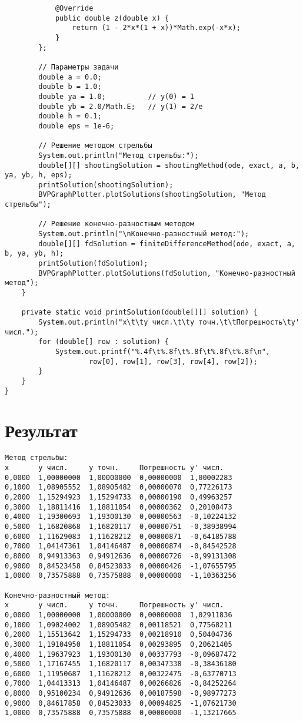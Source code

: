 \begin{verbatim}
            @Override
            public double z(double x) {
                return (1 - 2*x*(1 + x))*Math.exp(-x*x);
            }
        };

        // Параметры задачи
        double a = 0.0;
        double b = 1.0;
        double ya = 1.0;          // y(0) = 1
        double yb = 2.0/Math.E;   // y(1) = 2/e
        double h = 0.1;
        double eps = 1e-6;

        // Решение методом стрельбы
        System.out.println("Метод стрельбы:");
        double[][] shootingSolution = shootingMethod(ode, exact, a, b, ya, yb, h, eps);
        printSolution(shootingSolution);
        BVPGraphPlotter.plotSolutions(shootingSolution, "Метод стрельбы");

        // Решение конечно-разностным методом
        System.out.println("\nКонечно-разностный метод:");
        double[][] fdSolution = finiteDifferenceMethod(ode, exact, a, b, ya, yb, h);
        printSolution(fdSolution);
        BVPGraphPlotter.plotSolutions(fdSolution, "Конечно-разностный метод");
    }

    private static void printSolution(double[][] solution) {
        System.out.println("x\t\ty числ.\t\ty точн.\t\tПогрешность\ty' числ.");
        for (double[] row : solution) {
            System.out.printf("%.4f\t%.8f\t%.8f\t%.8f\t%.8f\n",
                    row[0], row[1], row[3], row[4], row[2]);
        }
    }
}
\end{verbatim}

\section*{Результат}

\begin{verbatim}
Метод стрельбы:
x		y числ.		y точн.		Погрешность	y' числ.
0,0000	1,00000000	1,00000000	0,00000000	1,00002283
0,1000	1,08905552	1,08905482	0,00000070	0,77226173
0,2000	1,15294923	1,15294733	0,00000190	0,49963257
0,3000	1,18811416	1,18811054	0,00000362	0,20108473
0,4000	1,19300693	1,19300130	0,00000563	-0,10224132
0,5000	1,16820868	1,16820117	0,00000751	-0,38938994
0,6000	1,11629083	1,11628212	0,00000871	-0,64185788
0,7000	1,04147361	1,04146487	0,00000874	-0,84542528
0,8000	0,94913363	0,94912636	0,00000726	-0,99131308
0,9000	0,84523458	0,84523033	0,00000426	-1,07655795
1,0000	0,73575888	0,73575888	0,00000000	-1,10363256

Конечно-разностный метод:
x		y числ.		y точн.		Погрешность	y' числ.
0,0000	1,00000000	1,00000000	0,00000000	1,02911836
0,1000	1,09024002	1,08905482	0,00118521	0,77568211
0,2000	1,15513642	1,15294733	0,00218910	0,50404736
0,3000	1,19104950	1,18811054	0,00293895	0,20621405
0,4000	1,19637923	1,19300130	0,00337793	-0,09687472
0,5000	1,17167455	1,16820117	0,00347338	-0,38436180
0,6000	1,11950687	1,11628212	0,00322475	-0,63770713
0,7000	1,04413313	1,04146487	0,00266826	-0,84252264
0,8000	0,95100234	0,94912636	0,00187598	-0,98977273
0,9000	0,84617858	0,84523033	0,00094825	-1,07621730
1,0000	0,73575888	0,73575888	0,00000000	-1,13217665
\end{verbatim}

